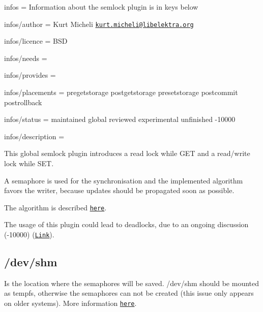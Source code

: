 
\begin{DoxyItemize}
\item infos = Information about the semlock plugin is in keys below
\item infos/author = Kurt Micheli \href{mailto:kurt.micheli@libelektra.org}{\tt kurt.\+micheli@libelektra.\+org}
\item infos/licence = B\+S\+D
\item infos/needs =
\item infos/provides =
\item infos/placements = pregetstorage postgetstorage presetstorage postcommit postrollback
\item infos/status = maintained global reviewed experimental unfinished -\/10000
\item infos/description =
\end{DoxyItemize}

This global semlock plugin introduces a read lock while {\ttfamily G\+E\+T} and a read/write lock while {\ttfamily S\+E\+T}.

A semaphore is used for the synchronisation and the implemented algorithm favors the writer, because updates should be propagated soon as possible.

The algorithm is described \href{https://en.wikipedia.org/wiki/Readers%E2%80%93writers_problem#Second_readers-writers_problem}{\tt here}.

The usage of this plugin could lead to deadlocks, due to an ongoing discussion (-\/10000) (\href{https://github.com/ElektraInitiative/libelektra/pull/555}{\tt Link}).

\subsection*{/dev/shm}

Is the location where the semaphores will be saved. {\ttfamily /dev/shm} should be mounted as tempfs, otherwise the semaphores can not be created (this issue only appears on older systems). More information \href{http://stackoverflow.com/questions/270113/how-do-i-stop-sem-open-failing-with-enosys}{\tt here}. 